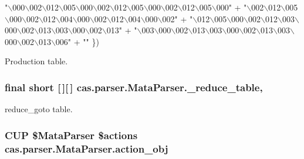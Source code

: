 \begin{DoxyCode}
    \textcolor{stringliteral}{"\(\backslash\)000\(\backslash\)002\(\backslash\)012\(\backslash\)005\(\backslash\)000\(\backslash\)002\(\backslash\)012\(\backslash\)005\(\backslash\)000\(\backslash\)002\(\backslash\)012\(\backslash\)005\(\backslash\)000"} +
    \textcolor{stringliteral}{"\(\backslash\)002\(\backslash\)012\(\backslash\)005\(\backslash\)000\(\backslash\)002\(\backslash\)012\(\backslash\)004\(\backslash\)000\(\backslash\)002\(\backslash\)012\(\backslash\)004\(\backslash\)000\(\backslash\)002"} +
    \textcolor{stringliteral}{"\(\backslash\)012\(\backslash\)005\(\backslash\)000\(\backslash\)002\(\backslash\)012\(\backslash\)003\(\backslash\)000\(\backslash\)002\(\backslash\)013\(\backslash\)003\(\backslash\)000\(\backslash\)002\(\backslash\)013"} +
    \textcolor{stringliteral}{"\(\backslash\)003\(\backslash\)000\(\backslash\)002\(\backslash\)013\(\backslash\)003\(\backslash\)000\(\backslash\)002\(\backslash\)013\(\backslash\)003\(\backslash\)000\(\backslash\)002\(\backslash\)013\(\backslash\)006"} +
    \textcolor{stringliteral}{""} \})
\end{DoxyCode}
Production table. \hypertarget{classcas_1_1parser_1_1_mata_parser_a15d061d34b6b6a927ca9b7c76799dbd7}{
\subsubsection[{\-\_\-reduce\-\_\-table}]{\setlength{\rightskip}{0pt plus 5cm}final short \mbox{[}$\,$\mbox{]}\mbox{[}$\,$\mbox{]} cas.\-parser.\-Mata\-Parser.\-\_\-reduce\-\_\-table\hspace{0.3cm}{\ttfamily [static]}, {\ttfamily [protected]}}}\label{classcas_1_1parser_1_1_mata_parser_a15d061d34b6b6a927ca9b7c76799dbd7}
{\ttfamily reduce\-\_\-goto} table. \hypertarget{classcas_1_1parser_1_1_mata_parser_aa3869480583db95ded43cab8a9e95076}{
\subsubsection[{action\-\_\-obj}]{\setlength{\rightskip}{0pt plus 5cm}C\-U\-P \${\bf Mata\-Parser} \$actions cas.\-parser.\-Mata\-Parser.\-action\-\_\-obj\hspace{0.3cm}{\ttfamily [protected]}}}\label{classcas_1_1parser_1_1_mata_parser_aa3869480583db95ded43cab8a9e95076}
